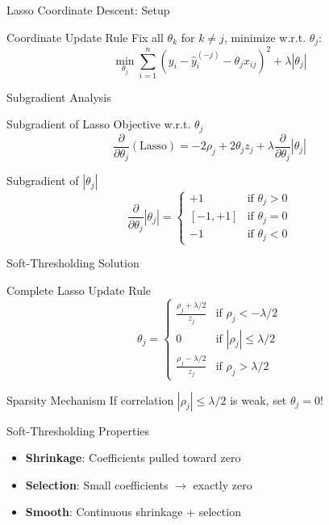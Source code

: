 \documentclass{beamer}
\begin{document}
\begin{frame}{Lasso Coordinate Descent: Setup}
\begin{codebox}{Coordinate Update Rule}
Fix all $\theta_k$ for $k \neq j$, minimize w.r.t. $\theta_j$:
$$\min_{\theta_j} \sum_{i=1}^{n} (y_i - \hat{y}_i^{(-j)} - \theta_j x_{ij})^2 + \lambda |\theta_j|$$
\end{codebox}
\end{frame}

\begin{frame}{Subgradient Analysis}
\begin{codebox}{Subgradient of Lasso Objective w.r.t. $\theta_j$}
$$\frac{\partial}{\partial \theta_{j}}(\text{Lasso}) = -2\rho_{j} + 2\theta_{j}z_{j} + \lambda \frac{\partial}{\partial \theta_{j}}|\theta_{j}|$$
\end{codebox}
\pause

\begin{theorembox}{Subgradient of $|\theta_j|$}
$$\frac{\partial}{\partial \theta_{j}}|\theta_{j}| = \begin{cases}
+1 & \text{if } \theta_{j} > 0 \\
[-1,+1] & \text{if } \theta_{j} = 0 \\
-1 & \text{if } \theta_{j} < 0
\end{cases}$$
\end{theorembox}
\end{frame}

\begin{frame}{Soft-Thresholding Solution}
\begin{theorembox}{Complete Lasso Update Rule}
$$\theta_{j} = \begin{cases}
\frac{\rho_{j} + \lambda/2}{z_{j}} & \text{if } \rho_{j} < -\lambda/2 \\
0 & \text{if } |\rho_{j}| \leq \lambda/2 \\
\frac{\rho_{j} - \lambda/2}{z_{j}} & \text{if } \rho_{j} > \lambda/2
\end{cases}$$
\end{theorembox}

\begin{alertbox}{Sparsity Mechanism}
If correlation $|\rho_j| \leq \lambda/2$ is weak, set $\theta_j = 0$!
\end{alertbox}

\begin{keypointsbox}{Soft-Thresholding Properties}
{\small
\begin{itemize}
\item \textbf{Shrinkage}: Coefficients pulled toward zero
\item \textbf{Selection}: Small coefficients $\rightarrow$ exactly zero
\item \textbf{Smooth}: Continuous shrinkage + selection
\end{itemize}
}
\end{keypointsbox}
\end{frame}
\end{document}
